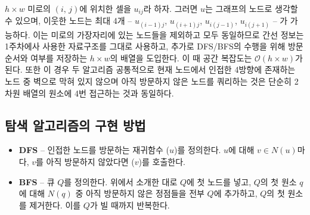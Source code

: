 $h\times w$ 미로의 $\left(i,\,j\right)$에 위치한 셀을 $u_{ij}$라 하자. 그러면 $u$는 그래프의 노드로 생각할 수 있으며,
이웃한 노드는 최대 4개 -- $u_{\left(i - 1\right)j}$, $u_{\left(i + 1\right)j}$,
$u_{i\left(j - 1\right)}$, $u_{i\left(j + 1\right)}$ -- 가 가능하다. 이는 미로의 가장자리에 있는 노드들을 제외하고
모두 동일하므로 간선 정보는 1주차에사 사용한 자료구조를 그대로 사용하고, 추가로 DFS/BFS의 수행을 위해 방문 순서와 여부를 저장하는 $h\times w$의
배열을 도입한다. 이 때 공간 복잡도는 $\mathcal{O}\left(h\times w\right)$가 된다.
또한 이 경우 두 알고리즘 공통적으로 현재 노드에서 인접한 4방향에 존재하는 노드 중 벽으로 막혀 있지 않으며
아직 방문하지 않은 노드를 쿼리하는 것은 단순히 2차원 배열의 원소에 4번 접근하는 것과 동일하다.

\subsection{탐색 알고리즘의 구현 방법}

\begin{itemize}
    \item \textbf{DFS} -- 인접한 노드를 방문하는 재귀함수 ($u$)를 정의한다. $u$에 대해
    $v \in N\left(u\right)$마다, $v$를 아직 방문하지 않았다면 ($v$)를 호출한다.
    \item \textbf{BFS} -- 큐 $Q$를 정의한다. 위에서 소개한 대로 $Q$에 첫 노드를 넣고,
    $Q$의 첫 원소 $q$에 대해 $N\left(q\right)$ 중 아직 방문하지 않은 정점들을 전부 $Q$에 추가하고,
    $Q$의 첫 원소를 제거한다. 이를 $Q$가 빌 때까지 반복한다. 
\end{itemize}


